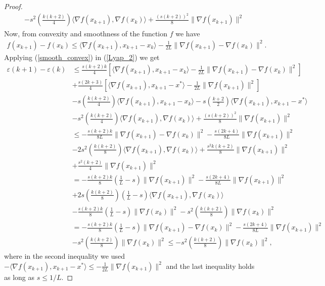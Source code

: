 \documentclass{article}
\theoremstyle{plain}
\theoremstyle{definition}
\theoremstyle{remark}
\begin{document}
\begin{proof}
\begin{align}
    & -s^2(\frac{k(k+2)}{4})\langle \nabla f(x_{k+1}),\nabla f(x_k)\rangle+ \frac{(s(k+2))^2}{8}\|\nabla f(x_{k+1})\|^2
\end{align}
Now, from convexity and smoothness of the function $f$ we have
\begin{align}\label{smooth_convex}
    f(x_{k+1})-f(x_k)\leq \langle \nabla f(x_{k+1}),x_{k+1}-x_k\rangle -\frac{1}{2L}\|\nabla f(x_{k+1})-\nabla f(x_k)\|^2.
\end{align}
Applying (\ref{smooth_convex}) in (\ref{Lyap_2}) we get
\begin{align}\label{Lyap_3}
     \varepsilon(k+1)-\varepsilon(k)&\leq \frac{s(k+2)k}{4}\left[ \langle \nabla f(x_{k+1}),x_{k+1}-x_k\rangle-\frac{1}{2L}\|\nabla f(x_{k+1})-\nabla f(x_k)\|^2 \right]\nonumber\\
     & +\frac{s(2k+3)}{4} \left[ \langle \nabla f(x_{k+1}),x_{k+1}-x^*\rangle-\frac{1}{2L}\|\nabla f(x_{k+1})\|^2 \right]\nonumber\\
     & -s(\frac{k(k+2)}{4})\langle \nabla f(x_{k+1}),x_{k+1}-x_k \rangle-s(\frac{k+2}{2})\langle \nabla f(x_{k+1}),x_{k+1}-x^* \rangle\nonumber\\
     & -s^2(\frac{k(k+2)}{4})\langle \nabla f(x_{k+1}),\nabla f(x_k)\rangle+ \frac{(s(k+2))^2}{8}\|\nabla f(x_{k+1})\|^2\nonumber\\
     &\leq -\frac{s(k+2)k}{8L}\|\nabla f(x_{k+1})-\nabla f(x_k)\|^2-\frac{s(2k+4)}{8L}\|\nabla f(x_{k+1})\|^2 \nonumber\\
     & -2s^2(\frac{k(k+2)}{8})\langle \nabla f(x_{k+1}),\nabla f(x_k)\rangle+\frac{s^2k(k+2)}{8}\|\nabla f(x_{k+1})\|^2\nonumber\\
     &+\frac{s^2(k+2)}{4}\|\nabla f(x_{k+1})\|^2\nonumber\\
     &=  -\frac{s(k+2)k}{8}(\frac{1}{L}-s)\|\nabla f(x_{k+1})\|^2-\frac{s(2k+4)}{8L}\|\nabla f(x_{k+1})\|^2\nonumber\\
     &+2s(\frac{k(k+2)}{8})(\frac{1}{L}-s)\langle \nabla f(x_{k+1}),\nabla f(x_k)\rangle\nonumber\\
     &-\frac{s(k+2)k}{8}(\frac{1}{L}-s)\|\nabla f(x_{k})\|^2-s^2(\frac{k(k+2)}{8})\|\nabla f(x_{k})\|^2\nonumber\\
     &= -\frac{s(k+2)k}{8}(\frac{1}{L}-s)\|\nabla f(x_{k+1})-\nabla f(x_k)\|^2-\frac{s(2k+4)}{8L}\|\nabla f(x_{k+1})\|^2\nonumber\\
     &-s^2(\frac{k(k+2)}{8})\|\nabla f(x_{k})\|^2\leq -s^2(\frac{k(k+2)}{8})\|\nabla f(x_{k})\|^2,
\end{align}
where in the second inequality we used $-\langle \nabla f(x_{k+1}),x_{k+1}-x^* \rangle\leq -\frac{1}{2L}\|\nabla f(x_{k+1})\|^2$ and the last inequality holds as long as $s\leq 1/L$.\par

\end{proof}
\end{document}
